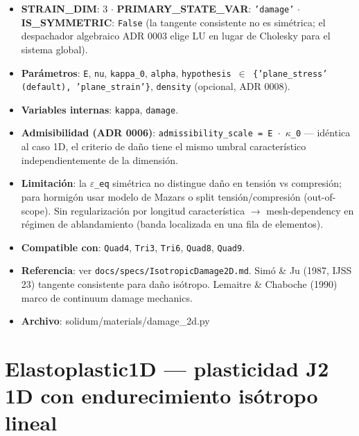 \documentclass[11pt,letterpaper,oneside]{report}
\begin{document}
\begin{itemize}
  \item \textbf{STRAIN\_DIM}: 3 \ensuremath{\cdot} \textbf{PRIMARY\_STATE\_VAR}: \texttt{'damage'} \ensuremath{\cdot} \textbf{IS\_SYMMETRIC}: \texttt{False} (la tangente consistente no es simétrica; el despachador algebraico ADR 0003 elige LU en lugar de Cholesky para el sistema global).
  \item \textbf{Parámetros}: \texttt{E}, \texttt{nu}, \texttt{kappa\_0}, \texttt{alpha}, \texttt{hypothesis \ensuremath{\in} \{'plane\_stress' (default), 'plane\_strain'\}}, \texttt{density} (opcional, ADR 0008).
  \item \textbf{Variables internas}: \texttt{kappa}, \texttt{damage}.
  \item \textbf{Admisibilidad (ADR 0006)}: \texttt{admissibility\_scale = E \ensuremath{\cdot} \ensuremath{\kappa}\_0} --- idéntica al caso 1D, el criterio de daño tiene el mismo umbral característico independientemente de la dimensión.
  \item \textbf{Limitación}: la \texttt{\ensuremath{\varepsilon}\_eq} simétrica no distingue daño en tensión vs compresión; para hormigón usar modelo de Mazars o split tensión/compresión (out-of-scope). Sin regularización por longitud característica \ensuremath{\to} mesh-dependency en régimen de ablandamiento (banda localizada en una fila de elementos).
  \item \textbf{Compatible con}: \texttt{Quad4}, \texttt{Tri3}, \texttt{Tri6}, \texttt{Quad8}, \texttt{Quad9}.
  \item \textbf{Referencia}: ver \texttt{docs/specs/IsotropicDamage2D.md}. Simó \& Ju (1987, IJSS 23) tangente consistente para daño isótropo. Lemaitre \& Chaboche (1990) marco de continuum damage mechanics.
  \item \textbf{Archivo}: solidum/materials/damage\_2d.py
\end{itemize}


\section{Elastoplastic1D --- plasticidad J2 1D con endurecimiento isótropo lineal}
\end{document}
